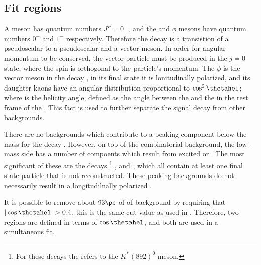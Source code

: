 \subsection{Fit regions}
\label{sec:dsphi:hel}
A \Bp meson has quantum numbers $J^P=0^-$, and the \Ds and $\phi$ mesons have
quantum numbers $0^-$ and $1^-$ respectively.
Therefore the decay \btodsphi is a transistion of a pseudoscalar to a pseudoscalar and a vector
meson.
In order for angular momentum to be conserved, the vector particle must be produced in the $j=0$
state, where the spin is orthogonal to the particle's momentum.
The $\phi$ is the vector meson in the decay \btodsphi, in its final state it is lonitudinally
polarized, and its daughter kaons have an angular distribution proportional to $\cos^2\thetahel$;
where \thetahel is the helicity angle, defined as the angle between the \Kp and the \Bp in the rest frame of the \Ds.
This fact is used to further separate the signal decay \btodsphi from other backgrounds.

There are no backgrounds which contribute to a peaking component below the \Bp mass for the decay
\btodsphi.
However, on top of the combinatorial background, the low-mass side has a number of compoents which
result from excited \Dssp or \Kstarz.
The most significant of these are the decays
\footnote{
  For these decays the \Kstarz refers to the $K^*(892)^0$ meson.
}
\btodsstrphi, \bstodskstrk and \bstodsstrkstrk, which all contain at least one final state particle
that is not reconstructed.
These peaking backgrounds do not necessarily result in a longitudilnally polarized \phii.

It is possible to remove about $93\pc$ of of background by requiring that $|\cos\thetahel|>0.4$,
this is the same cut value as used in .
Therefore, two regions are defined in terms of $\cos\thetahel$, and both are used in a simultaneous
fit.





